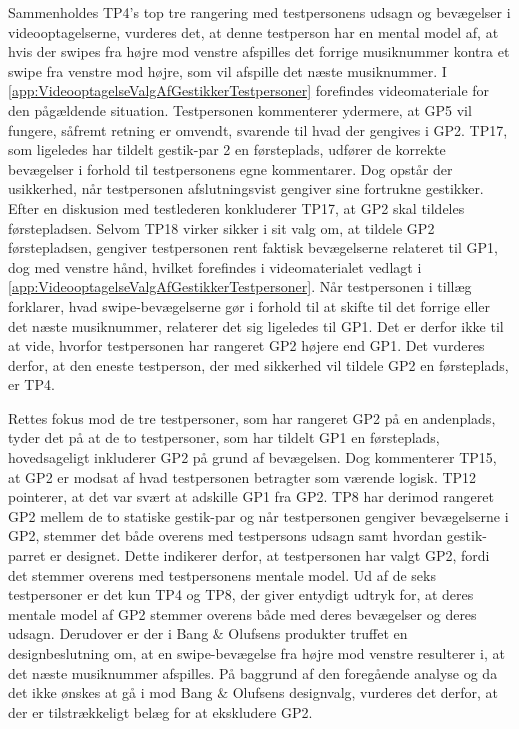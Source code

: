 \noindent
%
Sammenholdes TP4's top tre rangering med testpersonens udsagn og bevægelser i videooptagelserne, vurderes det, at denne testperson har en mental model af, at hvis der swipes fra højre mod venstre afspilles det forrige musiknummer kontra et swipe fra venstre mod højre, som vil afspille det næste musiknummer. I \autoref{app:VideooptagelseValgAfGestikkerTestpersoner} forefindes videomateriale for den pågældende situation. Testpersonen kommenterer ydermere, at GP5 vil fungere, såfremt retning er omvendt, svarende til hvad der gengives i GP2. TP17, som ligeledes har tildelt gestik-par 2 en førsteplads, udfører de korrekte bevægelser i forhold til testpersonens egne kommentarer. Dog opstår der usikkerhed, når testpersonen afslutningsvist gengiver sine fortrukne gestikker. Efter en diskusion med testlederen konkluderer TP17, at GP2 skal tildeles førstepladsen. Selvom TP18 virker sikker i sit valg om, at tildele GP2 førstepladsen, gengiver testpersonen rent faktisk bevægelserne relateret til GP1, dog med venstre hånd, hvilket forefindes i videomaterialet vedlagt i \autoref{app:VideooptagelseValgAfGestikkerTestpersoner}. Når testpersonen i tillæg forklarer, hvad swipe-bevægelserne gør i forhold til at skifte til det forrige eller det næste musiknummer, relaterer det sig ligeledes til GP1. Det er derfor ikke til at vide, hvorfor testpersonen har rangeret GP2 højere end GP1. Det vurderes derfor, at den eneste testperson, der med sikkerhed vil tildele GP2 en førsteplads, er TP4.

Rettes fokus mod de tre testpersoner, som har rangeret GP2 på en andenplads, tyder det på at de to testpersoner, som har tildelt GP1 en førsteplads, hovedsageligt inkluderer GP2 på grund af bevægelsen. Dog kommenterer TP15, at GP2 er modsat af hvad testpersonen betragter som værende logisk. TP12 pointerer, at det var svært at adskille GP1 fra GP2. TP8 har derimod rangeret GP2 mellem de to statiske gestik-par og når testpersonen gengiver bevægelserne i GP2, stemmer det både overens med testpersons udsagn samt hvordan gestik-parret er designet. Dette indikerer derfor, at testpersonen har valgt GP2, fordi det stemmer overens med testpersonens mentale model.\blankline 
%
Ud af de seks testpersoner er det kun TP4 og TP8, der giver entydigt udtryk for, at deres mentale model af GP2 stemmer overens både med deres bevægelser og deres udsagn. Derudover er der i Bang $\&$ Olufsens produkter truffet en designbeslutning om, at en swipe-bevægelse fra højre mod venstre resulterer i, at det næste musiknummer afspilles. På baggrund af den foregående analyse og da det ikke ønskes at gå i mod Bang $\&$ Olufsens designvalg, vurderes det derfor, at der er tilstrækkeligt belæg for at ekskludere GP2. 

